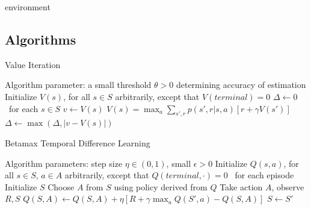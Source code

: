 environment\documentclass[11pt]{article} %
\begin{document}
\subsection{Algorithms}

\begin{algorithm}
  \caption{Value Iteration}

  \State Algorithm parameter: a small threshold $\theta > 0$ determining accuracy of estimation
  \State Initialize $V(s)$, for all $s \in S$ arbitrarily, except that $V(terminal) = 0$
  \State
  \While{$\Delta > \theta$}
    \State $\Delta \leftarrow 0$
    \Loop \ for each $s \in S$
      \State $v \leftarrow V(s)$
      \State $ V(s) = \max_a \sum_{s',r} p(s',r|s,a) \left[ r + \gamma V(s') \right] $
      \State $\Delta \leftarrow \max(\Delta, |v - V(s)|)$
    \EndLoop
  \EndWhile

\end{algorithm}

\begin{algorithm}
  \caption{Betamax Temporal Difference Learning}

  \State Algorithm parameters: step size $\eta \in (0, 1)$, small $\epsilon > 0$
  \State Initialize $Q(s,a)$, for all $s \in S$, $a \in A$ arbitrarily, except that $Q(terminal,\cdot) = 0$
  \State
  \Loop \ for each episode
    \State Initialize $S$
      \State Choose $A$ from $S$ using policy derived from $Q$
      \State Take action $A$, observe $R, S$
      \State $Q(S, A) \leftarrow Q(S, A) + \eta \left[ R + \gamma \max_a Q(S',a) − Q(S, A) \right] $
      \State $S \leftarrow S'$
    \EndWhile
  \EndLoop

\end{algorithm}
\end{document}

